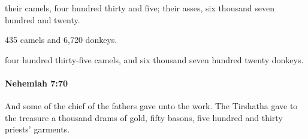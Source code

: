 			\begin{versebox}
					\item[BHS] 
					\item[LXX] 
					\item[ASV] their camels, four hundred thirty and five; their asses, six thousand seven hundred and twenty.
					\item[NIV] 435 camels and 6,720 donkeys.
					\item[NRSV] four hundred thirty-five camels, and six thousand seven hundred twenty donkeys.
			\end{versebox}

		\paragraph{Nehemiah 7:70} %
			\label{NEHEMIAH-7-70}

			And some of the chief of the fathers gave unto the work. The Tirshatha gave to the treasure a thousand drams of gold, fifty basons, five hundred and thirty priests’ garments.

